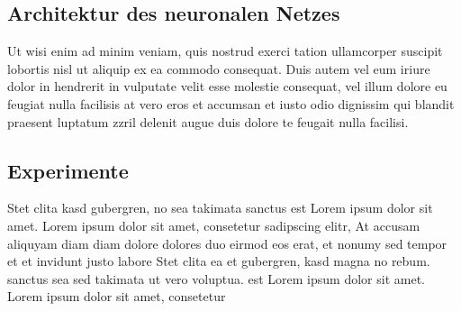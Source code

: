 \subsection{Architektur des neuronalen Netzes}
\label{umsetzung_training_architektur}

Ut wisi enim ad minim veniam, quis nostrud exerci tation ullamcorper suscipit lobortis nisl ut aliquip ex ea commodo consequat. Duis autem vel eum iriure dolor in hendrerit in vulputate velit esse molestie consequat, vel illum dolore eu feugiat nulla facilisis at vero eros et accumsan et iusto odio dignissim qui blandit praesent luptatum zzril delenit augue duis dolore te feugait nulla facilisi.


\subsection{Experimente}
\label{umsetzung_training_experimente}

 Stet clita kasd gubergren, no sea takimata sanctus est Lorem ipsum dolor sit amet. Lorem ipsum dolor sit amet, consetetur sadipscing elitr, At accusam aliquyam diam diam dolore dolores duo eirmod eos erat, et nonumy sed tempor et et invidunt justo labore Stet clita ea et gubergren, kasd magna no rebum. sanctus sea sed takimata ut vero voluptua. est Lorem ipsum dolor sit amet. Lorem ipsum dolor sit amet, consetetur

 
 

